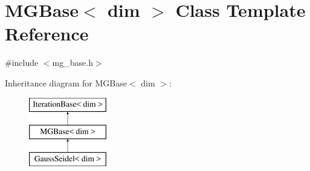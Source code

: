\hypertarget{class_m_g_base}{}\section{M\+G\+Base$<$ dim $>$ Class Template Reference}
\label{class_m_g_base}


{\ttfamily \#include $<$mg\+\_\+base.\+h$>$}

Inheritance diagram for M\+G\+Base$<$ dim $>$\+:\begin{figure}[H]
\begin{center}
\leavevmode
\includegraphics[height=3.000000cm]{class_m_g_base}
\end{center}
\end{figure}
